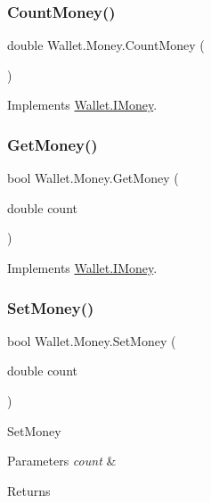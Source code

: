 \subsubsection{\texorpdfstring{Count\+Money()}{CountMoney()}}
{\footnotesize\ttfamily double Wallet.\+Money.\+Count\+Money (\begin{DoxyParamCaption}{ }\end{DoxyParamCaption})}



Implements \hyperlink{interface_wallet_1_1_i_money_a040ef42d0e14737cfc2342a5a824442b}{Wallet.\+I\+Money}.

\hypertarget{class_wallet_1_1_money_a6a66f552f42767fce97bd0945d91cd6b}{}\label{class_wallet_1_1_money_a6a66f552f42767fce97bd0945d91cd6b} 
\subsubsection{\texorpdfstring{Get\+Money()}{GetMoney()}}
{\footnotesize\ttfamily bool Wallet.\+Money.\+Get\+Money (\begin{DoxyParamCaption}\item[{double}]{count }\end{DoxyParamCaption})}



Implements \hyperlink{interface_wallet_1_1_i_money_a7eb41b256ff191c87f5bca82504244fe}{Wallet.\+I\+Money}.

\hypertarget{class_wallet_1_1_money_a5a37d3aa171327b361f985964dc44534}{}\label{class_wallet_1_1_money_a5a37d3aa171327b361f985964dc44534} 
\subsubsection{\texorpdfstring{Set\+Money()}{SetMoney()}}
{\footnotesize\ttfamily bool Wallet.\+Money.\+Set\+Money (\begin{DoxyParamCaption}\item[{double}]{count }\end{DoxyParamCaption})}



Set\+Money 


\begin{DoxyParams}{Parameters}
{\em count} & \\
\hline
\end{DoxyParams}
\begin{DoxyReturn}{Returns}

\end{DoxyReturn}


